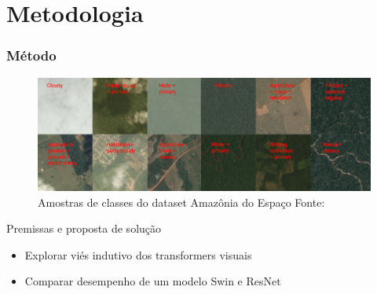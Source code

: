 \documentclass[8pt]{beamer}
\begin{document}
\section{Metodologia} 

\begin{frame}

\frametitle{Método}

\begin{figure}[!ht]
    \centering
    \includegraphics[width=0.9\columnwidth]{
        Imagens/chips.jpg
    }
    \caption{Amostras de classes do dataset Amazônia do Espaço Fonte:\cite{Kaggle:PlanetAmazonFromSpace}}\label{fig:dataset}
\end{figure}
 

\end{frame}



\begin{frame}{Premissas e proposta de solução}
    \begin{itemize}
        \item Explorar viés indutivo dos transformers visuais
        \item Comparar desempenho de um modelo Swin e ResNet
    \end{itemize}
    
\end{frame}
\end{document}
